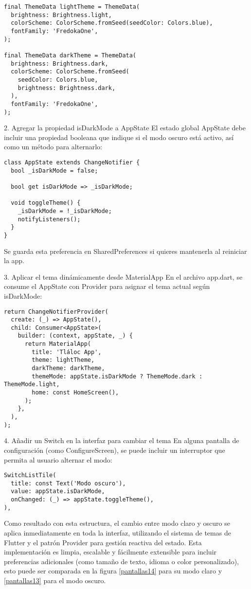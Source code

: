 \begin{verbatim}
final ThemeData lightTheme = ThemeData(
  brightness: Brightness.light,
  colorScheme: ColorScheme.fromSeed(seedColor: Colors.blue),
  fontFamily: 'FredokaOne',
);

final ThemeData darkTheme = ThemeData(
  brightness: Brightness.dark,
  colorScheme: ColorScheme.fromSeed(
    seedColor: Colors.blue,
    brightness: Brightness.dark,
  ),
  fontFamily: 'FredokaOne',
);
\end{verbatim}
2. Agregar la propiedad isDarkMode a AppState
El estado global AppState debe incluir una propiedad booleana que indique si el modo oscuro está activo, así como un método para alternarlo:

\begin{verbatim}
class AppState extends ChangeNotifier {
  bool _isDarkMode = false;

  bool get isDarkMode => _isDarkMode;

  void toggleTheme() {
    _isDarkMode = !_isDarkMode;
    notifyListeners();
  }
}
\end{verbatim}
Se guarda esta preferencia en SharedPreferences si quieres mantenerla al reiniciar la app.


3. Aplicar el tema dinámicamente desde MaterialApp
En el archivo app.dart, se consume el AppState con Provider para asignar el tema actual según isDarkMode:

\begin{verbatim}
return ChangeNotifierProvider(
  create: (_) => AppState(),
  child: Consumer<AppState>(
    builder: (context, appState, _) {
      return MaterialApp(
        title: 'Tláloc App',
        theme: lightTheme,
        darkTheme: darkTheme,
        themeMode: appState.isDarkMode ? ThemeMode.dark : ThemeMode.light,
        home: const HomeScreen(),
      );
    },
  ),
);
\end{verbatim}
4. Añadir un Switch en la interfaz para cambiar el tema
En alguna pantalla de configuración (como ConfigureScreen), se puede incluir un interruptor que permita al usuario alternar el modo:

\begin{verbatim}
SwitchListTile(
  title: const Text('Modo oscuro'),
  value: appState.isDarkMode,
  onChanged: (_) => appState.toggleTheme(),
),
\end{verbatim}
Como resultado con esta estructura, el cambio entre modo claro y oscuro se aplica inmediatamente en toda la interfaz, utilizando el sistema de temas de Flutter y el patrón Provider para gestión reactiva del estado. Esta implementación es limpia, escalable y fácilmente extensible para incluir preferencias adicionales (como tamaño de texto, idioma o color personalizado), esto puede ser comparada en la figura \ref{pantallas14} para su modo claro y \ref{pantallas13} para el modo oscuro.







